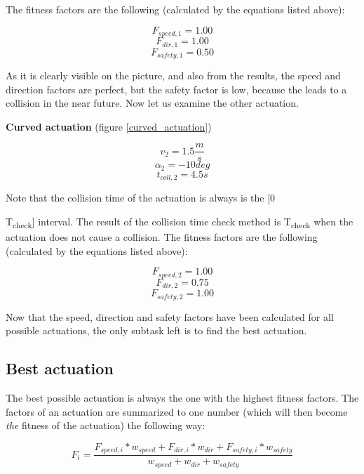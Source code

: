 The fitness factors are the following (calculated by the equations listed above):

\[ F_{speed,1} = 1.00 \]
\[ F_{dir,1} = 1.00 \]
\[ F_{safety,1} = 0.50 \]

As it is clearly visible on the picture, and also from the results, the speed and direction factors are perfect, but the safety factor is low, because the leads to a collision in the near future. Now let us examine the other actuation.

\textbf{Curved actuation} (figure \ref{curved_actuation})

\[ v_{2} = 1.5 \frac{m}{s} \]
\[ \alpha_{2} = -10 deg \]
\[ t_{coll,2} = 4.5 s \]

Note that the collision time of the actuation is always is the [0 {T\textsubscript{check}] interval. The result of the collision time check method is T\textsubscript{check} when the actuation does not cause a collision. The fitness factors are the following (calculated by the equations listed above):

\[ F_{speed,2} = 1.00 \]
\[ F_{dir,2} = 0.75 \]
\[ F_{safety,2} = 1.00 \]

Now that the speed, direction and safety factors have been calculated for all possible actuations, the only subtask left is to find the best actuation.

\subsection{Best actuation}

The best possible actuation is always the one with the highest fitness factors. The factors of an actuation are summarized to one number (which will then become \textit{the} fitness of the actuation) the following way:

\[ F_{i} = \frac{F_{speed,i} * w_{speed} + F_{dir,i} * w_{dir} + F_{safety,i} * w_{safety}}{w_{speed} + w_{dir} + w_{safety}} \]

}
